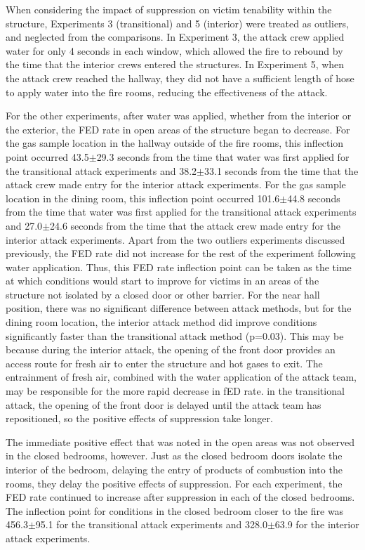 \documentclass[12pt,oneside]{book}
\begin{document}
When considering the impact of suppression on victim tenability within the structure, Experiments 3 (transitional) and 5 (interior) were treated as outliers, and neglected from the comparisons. In Experiment 3, the attack crew applied water for only 4 seconds in each window, which allowed the fire to rebound by the time that the interior crews entered the structures. In Experiment 5, when the attack crew reached the hallway, they did not have a sufficient length of hose to apply water into the fire rooms, reducing the effectiveness of the attack. 

For the other experiments, after water was applied, whether from the interior or the exterior, the FED rate in open areas of the structure began to decrease. For the gas sample location in the hallway outside of the fire rooms, this inflection point occurred 43.5$\pm$29.3 seconds from the time that water was first applied for the transitional attack experiments and 38.2$\pm$33.1 seconds from the time that the attack crew made entry for the interior attack experiments. For the gas sample location in the dining room, this inflection point occurred 101.6$\pm$44.8 seconds from the time that water was first applied for the transitional attack experiments and 27.0$\pm$24.6 seconds from the time that the attack crew made entry for the interior attack experiments. Apart from the two outliers experiments discussed previously, the FED rate did not increase for the rest of the experiment following water application. Thus, this FED rate inflection point can be taken as the time at which conditions would start to improve for victims in an areas of the structure not isolated by a closed door or other barrier. For the near hall position, there was no significant difference between attack methods, but for the dining room location, the interior attack method did improve conditions significantly faster than the transitional attack method (p=0.03). This may be because during the interior attack, the opening of the front door provides an access route for fresh air to enter the structure and hot gases to exit. The entrainment of fresh air, combined with the water application of the attack team, may be responsible for the more rapid decrease in fED rate. in the transitional attack, the opening of the front door is delayed until the attack team has repositioned, so the positive effects of suppression take longer.

The immediate positive effect that was noted in the open areas was not observed in the closed bedrooms, however. Just as the closed bedroom doors isolate the interior of the bedroom, delaying the entry of products of combustion into the rooms, they delay the positive effects of suppression. For each experiment, the FED rate continued to increase after suppression in each of the closed bedrooms. The inflection point for conditions in the closed bedroom closer to the fire was 456.3$\pm$95.1 for the transitional attack experiments and 328.0$\pm$63.9 for the interior attack experiments.  
\end{document}
